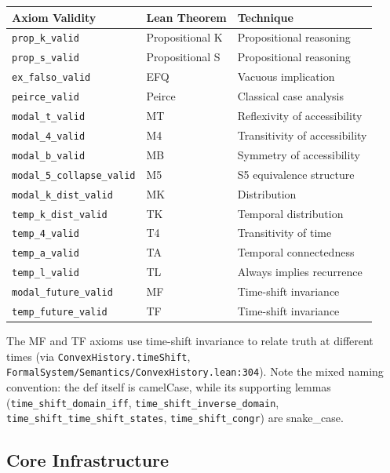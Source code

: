 \documentclass[../BimodalReference.tex]{subfiles}
\begin{document}
\begin{center}
\begin{tabular}{@{}lll@{}}
\toprule
Axiom Validity & Lean Theorem & Technique \\
\midrule
\texttt{prop\_k\_valid} & Propositional K & Propositional reasoning \\
\texttt{prop\_s\_valid} & Propositional S & Propositional reasoning \\
\texttt{ex\_falso\_valid} & EFQ & Vacuous implication \\
\texttt{peirce\_valid} & Peirce & Classical case analysis \\
\texttt{modal\_t\_valid} & MT & Reflexivity of accessibility \\
\texttt{modal\_4\_valid} & M4 & Transitivity of accessibility \\
\texttt{modal\_b\_valid} & MB & Symmetry of accessibility \\
\texttt{modal\_5\_collapse\_valid} & M5 & S5 equivalence structure \\
\texttt{modal\_k\_dist\_valid} & MK & Distribution \\
\texttt{temp\_k\_dist\_valid} & TK & Temporal distribution \\
\texttt{temp\_4\_valid} & T4 & Transitivity of time \\
\texttt{temp\_a\_valid} & TA & Temporal connectedness \\
\texttt{temp\_l\_valid} & TL & Always implies recurrence \\
\texttt{modal\_future\_valid} & MF & Time-shift invariance \\
\texttt{temp\_future\_valid} & TF & Time-shift invariance \\
\bottomrule
\end{tabular}
\end{center}

\noindent
The MF and TF axioms use time-shift invariance to relate truth at different times (via \texttt{ConvexHistory.timeShift}, \texttt{FormalSystem/Semantics/ConvexHistory.lean:304}). Note the mixed naming convention: the def itself is camelCase, while its supporting lemmas (\texttt{time\_shift\_domain\_iff}, \texttt{time\_shift\_inverse\_domain}, \texttt{time\_shift\_time\_shift\_states}, \texttt{time\_shift\_congr}) are snake\_case.

\subsection{Core Infrastructure}
\end{document}
